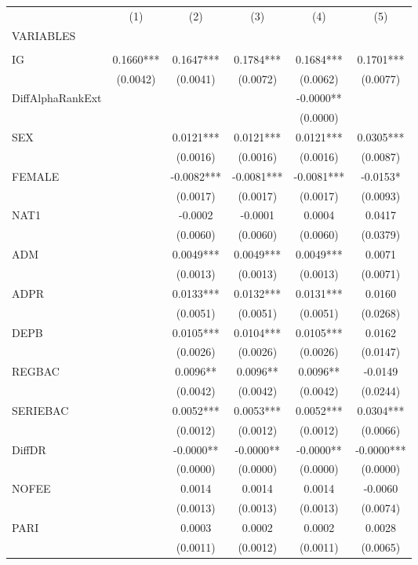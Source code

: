 \documentclass[]{article}
\begin{document}
\begin{tabular}{lccccc} \hline
 & (1) & (2) & (3) & (4) & (5) \\
VARIABLES &  &  &  &  &  \\ \hline
 &  &  &  &  &  \\
IG & 0.1660*** & 0.1647*** & 0.1784*** & 0.1684*** & 0.1701*** \\
 & (0.0042) & (0.0041) & (0.0072) & (0.0062) & (0.0077) \\
DiffAlphaRankExt &  &  &  & -0.0000** &  \\
 &  &  &  & (0.0000) &  \\
SEX &  & 0.0121*** & 0.0121*** & 0.0121*** & 0.0305*** \\
 &  & (0.0016) & (0.0016) & (0.0016) & (0.0087) \\
FEMALE &  & -0.0082*** & -0.0081*** & -0.0081*** & -0.0153* \\
 &  & (0.0017) & (0.0017) & (0.0017) & (0.0093) \\
NAT1 &  & -0.0002 & -0.0001 & 0.0004 & 0.0417 \\
 &  & (0.0060) & (0.0060) & (0.0060) & (0.0379) \\
ADM &  & 0.0049*** & 0.0049*** & 0.0049*** & 0.0071 \\
 &  & (0.0013) & (0.0013) & (0.0013) & (0.0071) \\
ADPR &  & 0.0133*** & 0.0132*** & 0.0131*** & 0.0160 \\
 &  & (0.0051) & (0.0051) & (0.0051) & (0.0268) \\
DEPB &  & 0.0105*** & 0.0104*** & 0.0105*** & 0.0162 \\
 &  & (0.0026) & (0.0026) & (0.0026) & (0.0147) \\
REGBAC &  & 0.0096** & 0.0096** & 0.0096** & -0.0149 \\
 &  & (0.0042) & (0.0042) & (0.0042) & (0.0244) \\
SERIEBAC &  & 0.0052*** & 0.0053*** & 0.0052*** & 0.0304*** \\
 &  & (0.0012) & (0.0012) & (0.0012) & (0.0066) \\
DiffDR &  & -0.0000** & -0.0000** & -0.0000** & -0.0000*** \\
 &  & (0.0000) & (0.0000) & (0.0000) & (0.0000) \\
NOFEE &  & 0.0014 & 0.0014 & 0.0014 & -0.0060 \\
 &  & (0.0013) & (0.0013) & (0.0013) & (0.0074) \\
PARI &  & 0.0003 & 0.0002 & 0.0002 & 0.0028 \\
 &  & (0.0011) & (0.0012) & (0.0011) & (0.0065) \\

\end{tabular}
\end{document}
